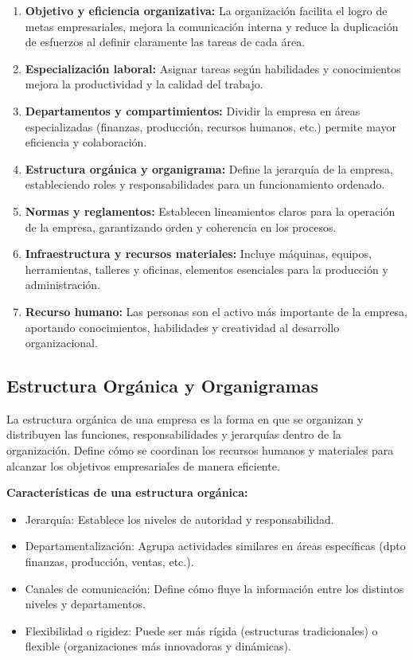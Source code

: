 \documentclass[a4paper,oneside,11pt]{article}
\begin{document}
\begin{enumerate}
    \item \textbf{Objetivo y eficiencia organizativa:} La organización facilita el logro de metas empresariales, mejora la comunicación interna y reduce la duplicación de esfuerzos al definir claramente las tareas de cada área.
    \item \textbf{Especialización laboral:} Asignar tareas según habilidades y conocimientos mejora la productividad y la calidad del trabajo.
    \item \textbf{Departamentos y compartimientos:} Dividir la empresa en áreas especializadas (finanzas, producción, recursos humanos, etc.) permite mayor eficiencia y colaboración.
    \item \textbf{Estructura orgánica y organigrama:} Define la jerarquía de la empresa, estableciendo roles y responsabilidades para un funcionamiento ordenado.
    \item \textbf{Normas y reglamentos:} Establecen lineamientos claros para la operación de la empresa, garantizando orden y coherencia en los procesos.
    \item \textbf{Infraestructura y recursos materiales:} Incluye máquinas, equipos, herramientas, talleres y oficinas, elementos esenciales para la producción y administración.
    \item \textbf{Recurso humano:} Las personas son el activo más importante de la empresa, aportando conocimientos, habilidades y creatividad al desarrollo organizacional.
\end{enumerate}


\subsection{Estructura Orgánica y Organigramas}

La estructura orgánica de una empresa es la forma en que se organizan y distribuyen las funciones, responsabilidades y jerarquías dentro de la organización. Define cómo se coordinan los recursos humanos y materiales para alcanzar los objetivos empresariales de manera eficiente.

\textbf{Características de una estructura orgánica:}

\begin{itemize}
    \item Jerarquía: Establece los niveles de autoridad y responsabilidad.
    \item Departamentalización: Agrupa actividades similares en áreas específicas (dpto finanzas, producción, ventas, etc.).
    \item Canales de comunicación: Define cómo fluye la información entre los distintos niveles y departamentos.
    \item Flexibilidad o rigidez: Puede ser más rígida (estructuras tradicionales) o flexible (organizaciones más innovadoras y dinámicas).
\end{itemize}
\end{document}
